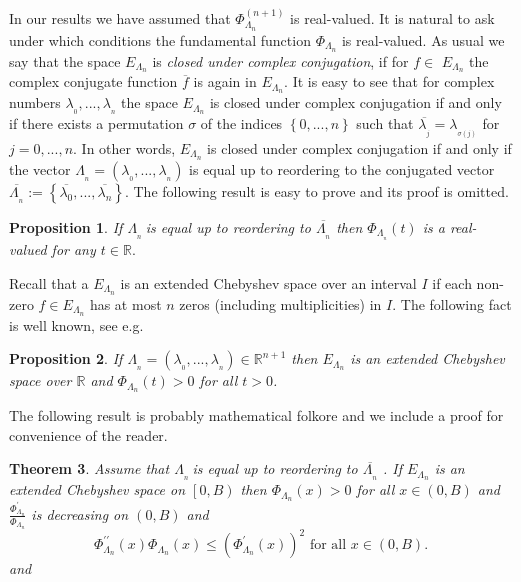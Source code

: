 \documentclass[11pt]{article}%
\newtheorem{theorem}{Theorem}
\newtheorem{proposition}[theorem]{Proposition}
\begin{document}
In our results we have assumed that $\Phi_{\Lambda_{n}}^{\left(  n+1\right)
}$ is real-valued. It is natural to ask under which conditions the fundamental
function $\Phi_{\Lambda_{n}}$ is real-valued. As usual we say that the space
$E_{\Lambda_{n}}$ is \emph{closed under complex conjugation}, if for $f\in$
$E_{\Lambda_{n}}$ the complex conjugate function $\overline{f}$ is again in
$E_{\Lambda_{n}}.$ It is easy to see that for complex numbers $\lambda_{_{0}%
},...,\lambda_{_{n}}$ the space $E_{\Lambda_{n}}$ is closed under complex
conjugation if and only if there exists a permutation $\sigma$ of the indices
$\left\{  0,...,n\right\}  $ such that $\overline{\lambda_{_{j}}}%
=\lambda_{_{\sigma\left(  j\right)  }}$ for $j=0,...,n.$ In other words,
$E_{\Lambda_{n}}$ is closed under complex conjugation if and only if the
vector $\Lambda_{_{n}}=\left(  \lambda_{_{0}},...,\lambda_{_{n}}\right)  $ is
equal up to reordering to the conjugated vector $\overline{\Lambda_{_{n}}%
}:=\left\{  \overline{\lambda_{0}},...,\overline{\lambda_{n}}\right\}  .$ The
following result is easy to prove and its proof is omitted.

\begin{proposition}
\label{Prop1}If $\Lambda_{_{n}}\ $is equal up to reordering to $\overline
{\Lambda_{_{n}}}$ then $\Phi_{\Lambda_{_{n}}}\left(  t\right)  $ is a
real-valued for any $t\in\mathbb{R}.$
\end{proposition}

Recall that a $E_{\Lambda_{n}}$ is an extended Chebyshev space over an
interval $I$ if each non-zero $f\in E_{\Lambda_{n}}$ has at most $n$ zeros
(including multiplicities) in $I$. The following fact is well known, see e.g.
\cite{KounchevRender2021JCAM}

\begin{proposition}
\label{Prop2}If $\Lambda_{_{n}}=\left(  \lambda_{_{0}},...,\lambda_{_{n}%
}\right)  \in\mathbb{R}^{n+1}$ then $E_{\Lambda_{n}}$ is an extended Chebyshev
space over $\mathbb{R}$ and $\Phi_{\Lambda_{n}}\left(  t\right)  >0$ for all
$t>0$.
\end{proposition}

The following result is probably mathematical folkore and we include a proof
for convenience of the reader.

\begin{theorem}
\label{ThmMicc} Assume that $\Lambda_{_{n}}\ $is equal up to reordering to
$\overline{\Lambda_{_{n}}}$ . If $E_{\Lambda_{n}}$ is an extended Chebyshev
space on $\left[  0,B\right)  $ then $\Phi_{\Lambda_{n}}\left(  x\right)  >0$
for all $x\in\left(  0,B\right)  $ and $\frac{\Phi_{\Lambda_{n}}^{\prime}%
}{\Phi_{\Lambda_{n}}}$ is decreasing on $\left(  0,B\right)  $ and
\[
\Phi_{\Lambda_{n}}^{\prime\prime}\left(  x\right)  \Phi_{\Lambda_{n}}\left(
x\right)  \leq\left(  \Phi_{\Lambda_{n}}^{\prime}\left(  x\right)  \right)
^{2}\text{ for all }x\in\left(  0,B\right)  .
\]
and
\end{theorem}
\end{document}
